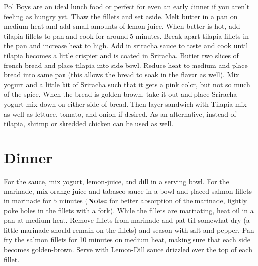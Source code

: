 \documentclass[oneside]{recipe}
\begin{document}

Po' Boys are an ideal lunch food or perfect for even an early dinner if you aren't feeling as hungry yet. Thaw the fillets and set aside. Melt butter in a pan on medium heat and add small amounts of lemon juice. When butter is hot, add tilapia fillets to pan and cook for around 5 minutes. Break apart tilapia fillets in the pan and increase heat to high. Add in sriracha sauce to taste and cook until tilapia becomes a little crispier and is coated in Sriracha. Butter two slices of french bread and place tilapia into side bowl. Reduce heat to medium and place bread into same pan (this allows the bread to soak in the flavor as well). Mix yogurt and a little bit of Sriracha such that it gets a pink color, but not so much of the spice. When the bread is golden brown, take it out and place Sriracha yogurt mix down on either side of bread. Then layer sandwich with Tilapia mix as well as lettuce, tomato, and onion if desired. As an alternative, instead of tilapia, shrimp or shredded chicken can be used as well. 

\chapter{Dinner}

For the sauce, mix yogurt, lemon-juice, and dill in a serving bowl. For the marinade, mix orange juice and tabasco sauce in a bowl and placed salmon fillets in marinade for 5 minutes (\textbf{Note:} for better absorption of the marinade, lightly poke holes in the fillets with a fork). While the fillets are marinating, heat oil in a pan at medium heat. Remove fillets from marinade and pat till somewhat dry (a little marinade should remain on the fillets) and season with salt and pepper. Pan fry the salmon fillets for 10 minutes on medium heat, making sure that each side becomes golden-brown. Serve with Lemon-Dill sauce drizzled over the top of each fillet. 

\end{document}
